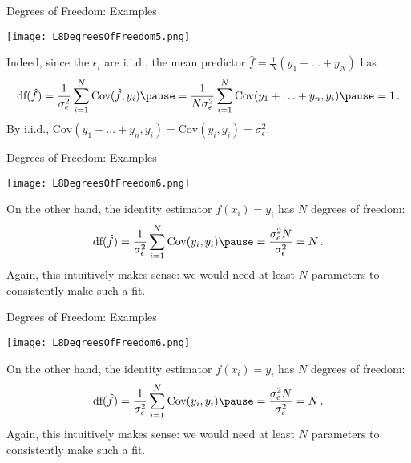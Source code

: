 \documentclass[10pt, table, dvipsnames,xcdraw,handout]{beamer}
\begin{document}
\begin{frame}[fragile]{Degrees of Freedom: Examples} 
  \begin{minipage}[t][0.5\textheight][t]{\textwidth}
	\centering \texttt{[image: L8DegreesOfFreedom5.png]} 
  \end{minipage}
  \vfill
\begin{minipage}[t][0.5\textheight][t]{\textwidth}
Indeed, since the $\epsilon_i$ are i.i.d., the mean predictor $\hat{f} = \frac{1}{N}(y_1+\ldots+y_N)$ has 
$$
\text{df}(\hat{f}) = \frac{1}{\sigma^2_\epsilon}\sum_{i=1}^N \text{Cov}(\hat{f},y_i) \pause = 
\frac{1}{N\sigma^2_\epsilon}\sum_{i=1}^N \text{Cov}(y_1+\ldots+y_n,y_i) \pause = 1\,.
$$
By i.i.d., $\text{Cov}(y_1+\ldots+y_n,y_i)  = \text{Cov}(y_i,y_i)  = \sigma^2_\epsilon$.
\end{minipage}
\end{frame}




\begin{frame}[fragile]{Degrees of Freedom: Examples} 
  \begin{minipage}[t][0.5\textheight][t]{\textwidth}
	\centering \texttt{[image: L8DegreesOfFreedom6.png]} 
  \end{minipage}
  \vfill
\begin{minipage}[t][0.5\textheight][t]{\textwidth}
On the other hand, the identity estimator $f(x_i) = y_i$ has $N$ degrees of freedom:
$$
\text{df}(\hat{f}) = \frac{1}{\sigma^2_\epsilon}\sum_{i=1}^N \text{Cov}(y_i,y_i) \pause = \frac{\sigma^2_\epsilon N }{\sigma^2_\epsilon} = N\,.
$$
Again, this intuitively makes sense: we would need at least $N$ parameters to consistently make such a fit. 
\end{minipage}
\end{frame}



\begin{frame}[fragile]{Degrees of Freedom: Examples} 
  \begin{minipage}[t][0.5\textheight][t]{\textwidth}
	\centering \texttt{[image: L8DegreesOfFreedom6.png]} 
  \end{minipage}
  \vfill
\begin{minipage}[t][0.5\textheight][t]{\textwidth}
On the other hand, the identity estimator $f(x_i) = y_i$ has $N$ degrees of freedom:
$$
\text{df}(\hat{f}) = \frac{1}{\sigma^2_\epsilon}\sum_{i=1}^N \text{Cov}(y_i,y_i) \pause = \frac{\sigma^2_\epsilon N }{\sigma^2_\epsilon} = N\,.
$$
Again, this intuitively makes sense: we would need at least $N$ parameters to consistently make such a fit. 
\end{minipage}
\end{frame}
\end{document}
